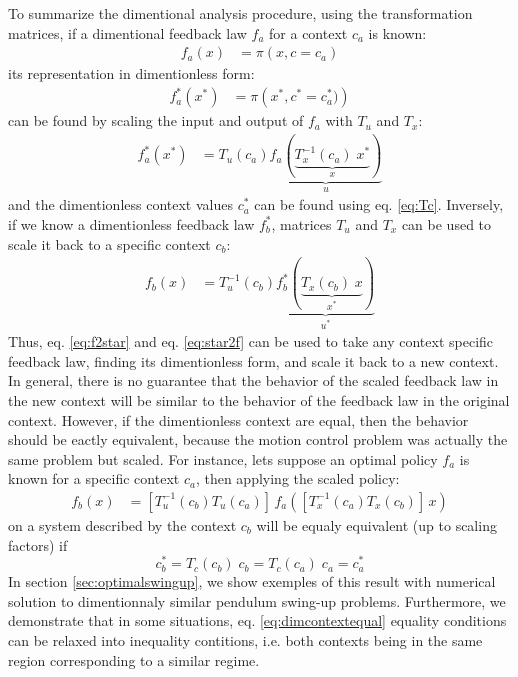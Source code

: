To summarize the dimentional analysis procedure, using the transformation matrices, if a dimentional feedback law $f_a$ for a context $c_a$ is known:
\begin{align}
f_a ( x ) &= \pi \left( x, c = c_a \right)
\end{align}
its representation in dimentionless form:
\begin{align}
f_a^* ( x^* ) &= \pi \left( x^*, c^* = c_a^* )\right) 
\end{align}
can be found by scaling the input and output of $f_a$ with $T_u$ and $T_x$:
\begin{align}
f_a^* ( x^* ) &= T_u(c_a) 
\underbrace{
f_a \left(  
\underbrace{
T_x^{-1}(c_a) \; x^*
}_{x}
\right)
}_{u}
\label{eq:f2star}
\end{align}
and the dimentionless context values $c^*_a$ can be found using eq. \eqref{eq:Tc}.
Inversely, if we know a dimentionless feedback law $f_b^*$, matrices $T_u$ and $T_x$ can be used to scale it back to a specific context $c_b$:
\begin{align}
f_b ( x ) &= T^{-1}_u(c_b) 
\underbrace{
f_b^* \left(  
\underbrace{
T_x(c_b) \; x
}_{x^*}
\right)
}_{u^*}
\label{eq:star2f}
\end{align}
Thus, eq. \eqref{eq:f2star} and eq. \eqref{eq:star2f} can be used to take any context specific feedback law, finding its dimentionless form, and scale it back to a new context. In general, there is no guarantee that the behavior of the scaled feedback law in the new context will be similar to the behavior of the feedback law in the original context. However, if the dimentionless context are equal, then the behavior should be eactly equivalent, because the motion control problem was actually the same problem but scaled. For instance, lets suppose an optimal policy $f_a$ is known for a specific context $c_a$, then applying the scaled policy:
\begin{align}
f_b ( x ) &= 
\left[ T^{-1}_u(c_b) 
T_u(c_a) \right] \,
f_a \left( 
\left[
T_x^{-1}(c_a) 
T_x(c_b)
\right] \,
x
\right)
\label{eq:ab_transform}
\end{align}
on a system described by the context $c_b$ will be equaly equivalent (up to scaling factors) if 
\begin{equation}
c_b^* =  T_c( c_b ) \; c_b  = T_c( c_a ) \; c_a = c_a^* 
\label{eq:dimcontextequal}
\end{equation}
In section \ref{sec:optimalswingup}, we show exemples of this result with numerical solution to dimentionnaly similar pendulum swing-up problems. Furthermore, we demonstrate that in some situations, eq. \eqref{eq:dimcontextequal} equality conditions can be relaxed into inequality contitions, i.e. both contexts being in the same region corresponding to a similar regime.


